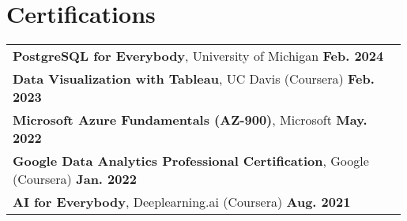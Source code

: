 \documentclass[letterpaper,11pt]{article}
\begin{document}
\section{Certifications}
\begin{tabular}{p{0.99\linewidth}}
    \hspace{0.15in}\textbf{PostgreSQL for Everybody}, University of Michigan
        \hfill \textbf{Feb. 2024} \\
    \hspace{0.15in}\textbf{Data Visualization with Tableau}, UC Davis (Coursera)
        \hfill \textbf{Feb. 2023} \\
    \hspace{0.15in}\textbf{Microsoft Azure Fundamentals (AZ-900)}, Microsoft
        \hfill \textbf{May. 2022} \\
    \hspace{0.15in}\textbf{Google Data Analytics Professional Certification}, Google (Coursera)
        \hfill \textbf{Jan. 2022} \\
    \hspace{0.15in}\textbf{AI for Everybody}, Deeplearning.ai (Coursera)
        \hfill \textbf{Aug. 2021} \\
\end{tabular}
\end{document}
